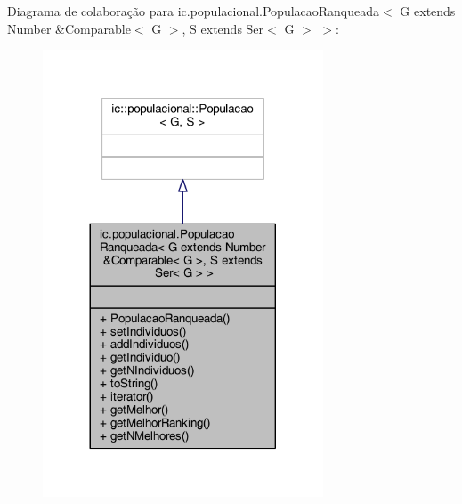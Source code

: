 Diagrama de colaboração para ic.\-populacional.\-Populacao\-Ranqueada$<$ G extends Number \&Comparable$<$ G $>$, S extends Ser$<$ G $>$ $>$\-:
\nopagebreak
\begin{figure}[H]
\begin{center}
\leavevmode
\includegraphics[width=236pt]{classic_1_1populacional_1_1_populacao_ranqueada_3_01_g_01extends_01_number_01_6_comparable_3_01_6a9184ea3cae037e6ccd0306c023b6cf}
\end{center}
\end{figure}

